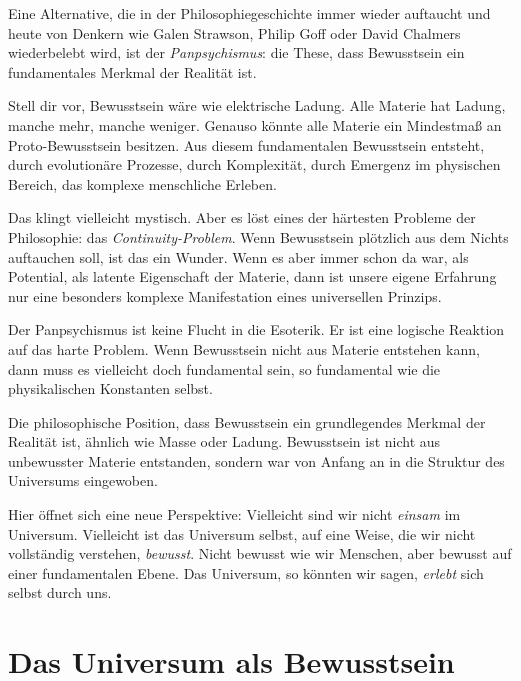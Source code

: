 Eine Alternative, die in der Philosophiegeschichte immer wieder auftaucht und heute von Denkern wie Galen Strawson, Philip Goff oder David Chalmers wiederbelebt wird, ist der \emph{Panpsychismus}: die These, dass Bewusstsein ein fundamentales Merkmal der Realität ist.

Stell dir vor, Bewusstsein wäre wie elektrische Ladung. Alle Materie hat Ladung, manche mehr, manche weniger. Genauso könnte alle Materie ein Mindestmaß an \glqq Proto-Bewusstsein\grqq{} besitzen. Aus diesem fundamentalen Bewusstsein entsteht, durch evolutionäre Prozesse, durch Komplexität, durch Emergenz im physischen Bereich, das komplexe menschliche Erleben.

Das klingt vielleicht mystisch. Aber es löst eines der härtesten Probleme der Philosophie: das \emph{Continuity-Problem}. Wenn Bewusstsein plötzlich aus dem Nichts auftauchen soll, ist das ein Wunder. Wenn es aber immer schon da war, als Potential, als latente Eigenschaft der Materie, dann ist unsere eigene Erfahrung nur eine besonders komplexe Manifestation eines universellen Prinzips.

Der Panpsychismus ist keine Flucht in die Esoterik. Er ist eine logische Reaktion auf das harte Problem. Wenn Bewusstsein nicht aus Materie entstehen kann, dann muss es vielleicht doch fundamental sein, so fundamental wie die physikalischen Konstanten selbst.

\begin{defi}[Panpsychismus]
	Die philosophische Position, dass Bewusstsein ein grundlegendes Merkmal der Realität ist, ähnlich wie Masse oder Ladung. Bewusstsein ist nicht aus \glqq unbewusster\grqq{} Materie entstanden, sondern war von Anfang an in die Struktur des Universums eingewoben.
\end{defi}

Hier öffnet sich eine neue Perspektive: Vielleicht sind wir nicht \emph{einsam} im Universum. Vielleicht ist das Universum selbst, auf eine Weise, die wir nicht vollständig verstehen, \emph{bewusst}. Nicht bewusst wie wir Menschen, aber bewusst auf einer fundamentalen Ebene. Das Universum, so könnten wir sagen, \emph{erlebt} sich selbst durch uns.

\section{Das Universum als Bewusstsein}

